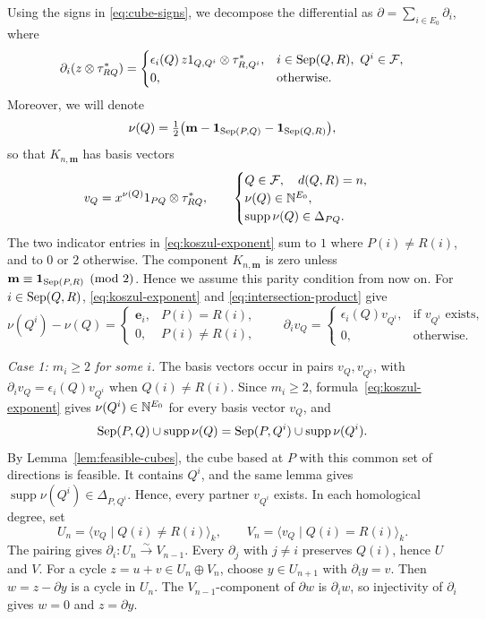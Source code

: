 Using the signs in \eqref{eq:cube-signs}, we decompose the differential as
$\partial=\sum_{i\in E_0}\partial_i$, where
\[
 \partial_i(z\otimes\tau_{RQ}^*)=
 \begin{cases}
  \epsilon_i(Q)\,z 1_{Q,Q^i}\otimes\tau_{R,Q^i}^*,
     &i\in\operatorname{Sep}(Q,R),\ Q^i\in\mathcal F,\\
  0,&\text{otherwise}.
 \end{cases}
\]
Moreover, we will denote
\begin{equation}\label{eq:koszul-exponent}
 \nu(Q)=\tfrac12\bigl(\mathbf m-\mathbf 1_{\operatorname{Sep}(P,Q)}
                              -\mathbf 1_{\operatorname{Sep}(Q,R)}\bigr),
\end{equation}
so that $K_{n,\mathbf m}$ has basis vectors
\[
 v_Q=x^{\nu(Q)}1_{PQ}\otimes\tau_{RQ}^*,\qquad
 \begin{cases}
  Q\in\mathcal F,\quad d(Q,R)=n,\\
  \nu(Q)\in\mathbb N^{E_0},\\
  \operatorname{supp}\nu(Q)\in\Delta_{PQ}.
 \end{cases}
\]
The two indicator entries in \eqref{eq:koszul-exponent} sum to
$1$ where $P(i)\ne R(i)$, and to $0$ or $2$ otherwise.
The component $K_{n,\mathbf m}$ is zero unless
$\mathbf m\equiv\mathbf 1_{\operatorname{Sep}(P,R)}\pmod2$. Hence we assume this parity condition from now on.
For $i\in\operatorname{Sep}(Q,R)$, \eqref{eq:koszul-exponent} and
\eqref{eq:intersection-product} give
\[
 \nu(Q^i)-\nu(Q)=
 \begin{cases}
  \mathbf e_i,&P(i)=R(i),\\
  0,&P(i)\ne R(i),
 \end{cases}
 \qquad
 \partial_i v_Q=
 \begin{cases}
  \epsilon_i(Q)v_{Q^i},&\text{if }v_{Q^i}\text{ exists},\\
  0,&\text{otherwise}.
 \end{cases}
\]

\smallskip
\noindent\emph{Case 1: $m_i\geq2$ for some $i$.}
The basis vectors occur in pairs $v_Q,v_{Q^i}$, with
$\partial_i v_Q=\epsilon_i(Q)v_{Q^i}$ when $Q(i)\ne R(i)$.
Since $m_i\geq2$, formula~\eqref{eq:koszul-exponent} gives
$\nu(Q^i)\in\mathbb N^{E_0}$ for every basis vector $v_Q$, and
\[
 \operatorname{Sep}(P,Q)\cup\operatorname{supp}\nu(Q)
 =\operatorname{Sep}(P,Q^i)\cup\operatorname{supp}\nu(Q^i).
\]
By Lemma~\ref{lem:feasible-cubes}, the cube based at $P$ with this
common set of directions is feasible. It contains $Q^i$, and the
same lemma gives $\operatorname{supp}\nu(Q^i)\in\Delta_{P,Q^i}$.
Hence, every partner $v_{Q^i}$ exists.
In each homological degree, set
\[
 U_n=\langle v_Q\mid Q(i)\ne R(i)\rangle_k,\qquad
 V_n=\langle v_Q\mid Q(i)=R(i)\rangle_k.
\]
The pairing gives $\partial_i:U_n\xrightarrow{\sim}V_{n-1}$.
Every $\partial_j$ with $j\ne i$ preserves $Q(i)$, hence $U$ and $V$.
For a cycle $z=u+v\in U_n\oplus V_n$, choose
$y\in U_{n+1}$ with $\partial_i y=v$.
Then $w=z-\partial y$ is a cycle in $U_n$.
The $V_{n-1}$-component of $\partial w$ is $\partial_i w$, so
injectivity of $\partial_i$ gives $w=0$ and $z=\partial y$.

